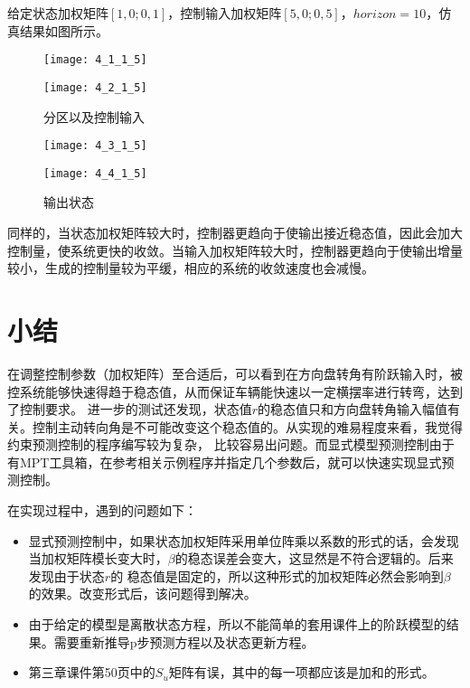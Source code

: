 \documentclass[UTF8]{article}
\begin{document}
给定状态加权矩阵$[1,0;0,1]$，控制输入加权矩阵$[5,0;0,5]$，$horizon = 10$，仿真结果如图所示。
\begin{figure}[htbp]
    \setlength{\belowcaptionskip}{-0.45cm}
    
        \begin{minipage}{0.49\textwidth}
        \centering
    
        \texttt{[image: 4\_1\_1\_5]}    
        \end{minipage}
        \begin{minipage}{0.49\textwidth}
        \centering
        \texttt{[image: 4\_2\_1\_5]}    
        \end{minipage}
    \caption{分区以及控制输入}
    \label{fig:1_9}
\end{figure}
\begin{figure}[htbp]
    \setlength{\belowcaptionskip}{-0.45cm}
    
        \begin{minipage}{0.49\textwidth}
        \centering
    
        \texttt{[image: 4\_3\_1\_5]}    
        \end{minipage}
        \begin{minipage}{0.49\textwidth}
        \centering
        \texttt{[image: 4\_4\_1\_5]}    
        \end{minipage}
    \caption{输出状态}
    \label{fig:1_10}
\end{figure}

同样的，当状态加权矩阵较大时，控制器更趋向于使输出接近稳态值，因此会加大控制量，使系统更快的收敛。当输入加权矩阵较大时，控制器更趋向于使输出增量较小，生成的控制量较为平缓，相应的系统的收敛速度也会减慢。

\section{小结}
在调整控制参数（加权矩阵）至合适后，可以看到在方向盘转角有阶跃输入时，被控系统能够快速得趋于稳态值，从而保证车辆能快速以一定横摆率进行转弯，达到了控制要求。
进一步的测试还发现，状态值$r$的稳态值只和方向盘转角输入幅值有关。控制主动转向角是不可能改变这个稳态值的。从实现的难易程度来看，我觉得约束预测控制的程序编写较为复杂，
比较容易出问题。而显式模型预测控制由于有MPT工具箱，在参考相关示例程序并指定几个参数后，就可以快速实现显式预测控制。

在实现过程中，遇到的问题如下：
\begin{itemize}
    \item 显式预测控制中，如果状态加权矩阵采用单位阵乘以系数的形式的话，会发现当加权矩阵模长变大时，$\beta$的稳态误差会变大，这显然是不符合逻辑的。后来发现由于状态$r$的
稳态值是固定的，所以这种形式的加权矩阵必然会影响到$\beta$的效果。改变形式后，该问题得到解决。
    \item 由于给定的模型是离散状态方程，所以不能简单的套用课件上的阶跃模型的结果。需要重新推导p步预测方程以及状态更新方程。
    \item 第三章课件第50页中的$S_{u}$矩阵有误，其中的每一项都应该是加和的形式。
\end{itemize}
\end{document}
